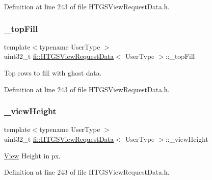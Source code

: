 Definition at line 243 of file H\+T\+G\+S\+View\+Request\+Data.\+h.

\mbox{\label{classfi_1_1HTGSViewRequestData_a6b1d10ec57580794909ffdea14a81e6e}} 
\subsubsection{\texorpdfstring{\+\_\+top\+Fill}{\_topFill}}
{\footnotesize\ttfamily template$<$typename User\+Type $>$ \\
uint32\+\_\+t \hyperlink{classfi_1_1HTGSViewRequestData}{fi\+::\+H\+T\+G\+S\+View\+Request\+Data}$<$ User\+Type $>$\+::\+\_\+top\+Fill\hspace{0.3cm}{\ttfamily [private]}}



Top rows to fill with ghost data. 



Definition at line 243 of file H\+T\+G\+S\+View\+Request\+Data.\+h.

\mbox{\label{classfi_1_1HTGSViewRequestData_a48a252c411cf994d1e4b4edf028dcb9a}} 
\subsubsection{\texorpdfstring{\+\_\+view\+Height}{\_viewHeight}}
{\footnotesize\ttfamily template$<$typename User\+Type $>$ \\
uint32\+\_\+t \hyperlink{classfi_1_1HTGSViewRequestData}{fi\+::\+H\+T\+G\+S\+View\+Request\+Data}$<$ User\+Type $>$\+::\+\_\+view\+Height\hspace{0.3cm}{\ttfamily [private]}}



\hyperlink{classfi_1_1View}{View} Height in px. 



Definition at line 243 of file H\+T\+G\+S\+View\+Request\+Data.\+h.

